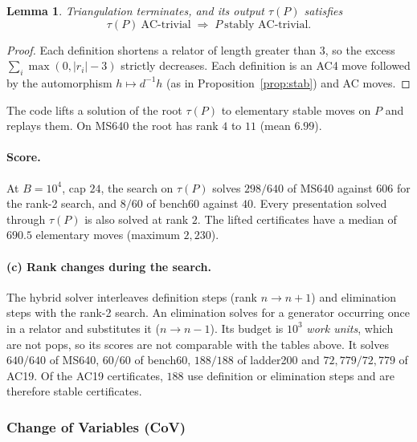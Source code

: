 \documentclass[11pt]{article}
\newtheorem{lemma}[theorem]{Lemma}
\theoremstyle{definition}
\theoremstyle{remark}
\begin{document}
\begin{lemma}
Triangulation terminates, and its output $\tau(P)$ satisfies
\[\tau(P)\ \text{AC-trivial}\;\Longrightarrow\;P\ \text{stably AC-trivial}.\]
\end{lemma}

\begin{proof}
Each definition shortens a relator of length greater than $3$, so the excess $\sum_i\max(0,|r_i|-3)$ strictly
decreases. Each definition is an AC4 move followed by the automorphism $h\mapsto d^{-1}h$ (as in
Proposition~\ref{prop:stab}) and AC moves.
\end{proof}

The code lifts a solution of the root $\tau(P)$ to elementary stable moves on $P$ and replays them. On MS640 the
root has rank $4$ to $11$ (mean $6.99$).

\paragraph{Score.} At $B=10^4$, cap $24$, the search on $\tau(P)$ solves $298/640$ of MS640 against $606$ for the
rank-2 search, and $8/60$ of bench60 against $40$. Every presentation solved through $\tau(P)$ is also solved at rank
$2$. The lifted certificates have a median of $690.5$ elementary moves (maximum $2{,}230$).

\paragraph{(c) Rank changes during the search.} The hybrid solver interleaves definition steps (rank $n\to n+1$) and
elimination steps with the rank-2 search. An elimination solves for a generator occurring once in a relator and
substitutes it ($n\to n-1$). Its budget is $10^3$ \emph{work units}, which are not pops, so its scores are not
comparable with the tables above. It solves $640/640$ of MS640, $60/60$ of bench60, $188/188$ of ladder200 and
$72{,}779/72{,}779$ of AC19. Of the AC19 certificates, $188$ use definition or elimination steps and are therefore
stable certificates.

\subsubsection{Change of Variables (CoV)}
\end{document}
